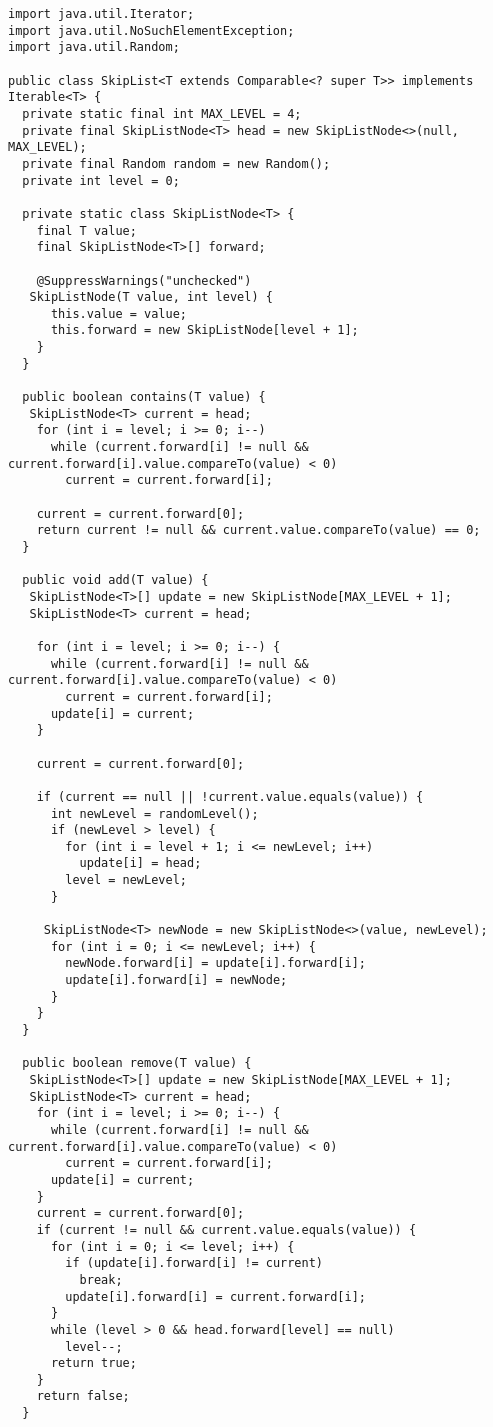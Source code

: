 \begin{verbatim}
import java.util.Iterator;
import java.util.NoSuchElementException;
import java.util.Random;

public class SkipList<T extends Comparable<? super T>> implements Iterable<T> {
  private static final int MAX_LEVEL = 4; 
  private final SkipListNode<T> head = new SkipListNode<>(null, MAX_LEVEL);
  private final Random random = new Random();
  private int level = 0;

  private static class SkipListNode<T> {
    final T value;
    final SkipListNode<T>[] forward;

    @SuppressWarnings("unchecked")
   SkipListNode(T value, int level) {
      this.value = value;
      this.forward = new SkipListNode[level + 1];
    }
  }

  public boolean contains(T value) {
   SkipListNode<T> current = head;
    for (int i = level; i >= 0; i--)
      while (current.forward[i] != null && current.forward[i].value.compareTo(value) < 0)
        current = current.forward[i];

    current = current.forward[0];
    return current != null && current.value.compareTo(value) == 0;
  }

  public void add(T value) {
   SkipListNode<T>[] update = new SkipListNode[MAX_LEVEL + 1];
   SkipListNode<T> current = head;

    for (int i = level; i >= 0; i--) {
      while (current.forward[i] != null && current.forward[i].value.compareTo(value) < 0)
        current = current.forward[i];
      update[i] = current;
    }

    current = current.forward[0];

    if (current == null || !current.value.equals(value)) {
      int newLevel = randomLevel();
      if (newLevel > level) {
        for (int i = level + 1; i <= newLevel; i++)
          update[i] = head;
        level = newLevel;
      }

     SkipListNode<T> newNode = new SkipListNode<>(value, newLevel);
      for (int i = 0; i <= newLevel; i++) {
        newNode.forward[i] = update[i].forward[i];
        update[i].forward[i] = newNode;
      }
    }
  }

  public boolean remove(T value) {
   SkipListNode<T>[] update = new SkipListNode[MAX_LEVEL + 1];
   SkipListNode<T> current = head;
    for (int i = level; i >= 0; i--) {
      while (current.forward[i] != null && current.forward[i].value.compareTo(value) < 0)
        current = current.forward[i];
      update[i] = current;
    }
    current = current.forward[0];
    if (current != null && current.value.equals(value)) {
      for (int i = 0; i <= level; i++) {
        if (update[i].forward[i] != current)
          break;
        update[i].forward[i] = current.forward[i];
      }
      while (level > 0 && head.forward[level] == null)
        level--;
      return true;
    }
    return false;
  }


\end{verbatim}
